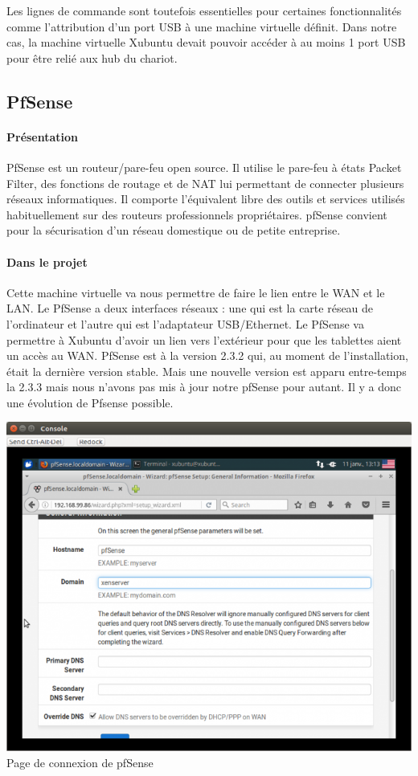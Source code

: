 \documentclass[a4paper,12pt]{extarticle}
\begin{document}
Les lignes de commande sont toutefois essentielles pour certaines fonctionnalités comme l’attribution d’un port USB à une machine virtuelle définit. Dans notre cas, la machine virtuelle Xubuntu devait pouvoir accéder à au moins 1 port USB pour être relié aux hub du chariot.

\subsection{PfSense}
\paragraph{Présentation\\}

PfSense est un routeur/pare-feu open source. Il utilise le pare-feu à états Packet Filter, des fonctions de routage et de NAT lui permettant de connecter plusieurs réseaux informatiques. Il comporte l'équivalent libre des outils et services utilisés habituellement sur des routeurs professionnels propriétaires. pfSense convient pour la sécurisation d'un réseau domestique ou de petite entreprise.


\paragraph{Dans le projet\\}

Cette machine virtuelle va nous permettre de faire le lien entre le WAN et le LAN. Le PfSense a deux interfaces réseaux : une qui est la carte réseau de l’ordinateur et l’autre qui est l’adaptateur USB/Ethernet. Le PfSense va permettre à Xubuntu d’avoir un lien vers l’extérieur pour que les tablettes aient un accès au WAN. \newline
PfSense est à la version 2.3.2 qui, au moment de l’installation, était la dernière version stable. Mais une nouvelle version est apparu entre-temps la 2.3.3 mais nous n’avons pas mis à jour notre pfSense pour autant. Il y a donc une évolution de Pfsense possible.  

\begin{center}
\includegraphics[scale=0.65]{pfsense}\\
Page de connexion de pfSense
\end{center}
\end{document}
